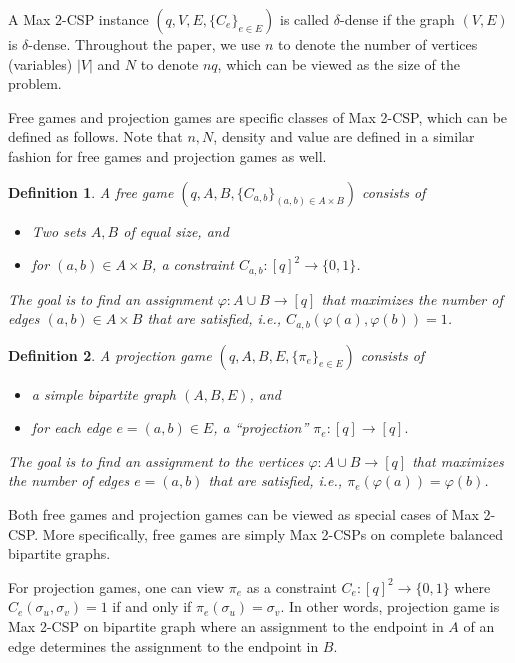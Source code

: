 \documentclass{article}
\newtheorem{definition}{Definition}
\begin{document}
A {\sc Max $2$-CSP} instance $(q, V, E, \{C_e\}_{e \in E})$ is called $\delta$-dense if the graph $(V, E)$ is $\delta$-dense. Throughout the paper, we use $n$ to denote the number of vertices (variables) $|V|$ and $N$ to denote $nq$, which can be viewed as the size of the problem.

Free games and projection games are specific classes of {\sc Max 2-CSP}, which can be defined as follows. Note that $n, N$, density and value are defined in a similar fashion for free games and projection games as well. \\

\begin{definition} A free game $(q, A, B, \{C_{a, b}\}_{(a, b) \in A \times B})$ consists of
\begin{itemize}
  \item Two sets $A, B$ of equal size, and
  \item for $(a, b) \in A \times B$, a constraint $C_{a, b} : [q]^2 \to \{0, 1\}$.
\end{itemize}
The goal is to find an assignment $\varphi : A \cup B \to [q]$ that maximizes the number of edges $(a, b) \in A \times B$ that are satisfied, i.e., $C_{a, b}(\varphi(a), \varphi(b)) = 1$. \\
\end{definition}

\begin{definition}
A projection game $(q, A, B, E, \{\pi_e\}_{e \in E})$ consists of
\begin{itemize}
  \item a simple bipartite graph $(A, B, E)$, and
  \item for each edge $e = (a, b) \in E$, a ``projection'' $\pi_e : [q] \to [q].$
\end{itemize}
The goal is to find an assignment to the vertices $\varphi : A \cup B \to [q]$ that maximizes the number of edges $e = (a, b)$ that are satisfied, i.e., $\pi_e(\varphi(a)) = \varphi(b)$.
\end{definition}

Both free games and projection games can be viewed as special cases of {\sc Max 2-CSP}. More specifically, free games are simply Max 2-CSPs on complete balanced bipartite graphs.

For projection games, one can view $\pi_e$ as a constraint $C_e: [q]^2 \to \{0, 1\}$ where $C_e(\sigma_u, \sigma_v) = 1$ if and only if $\pi_e(\sigma_u) = \sigma_v$. In other words, projection game is {\sc Max 2-CSP} on bipartite graph where an assignment to the endpoint in $A$ of an edge determines the assignment to the endpoint in $B$.
\end{document}
